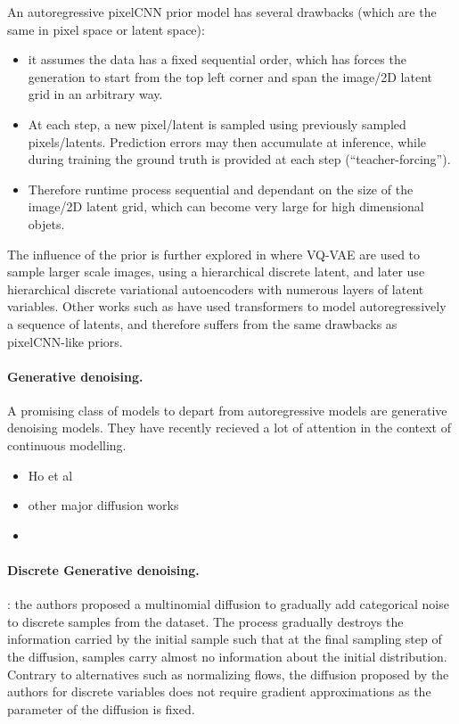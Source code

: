 \documentclass{article}
\begin{document}
An autoregressive pixelCNN prior model has several drawbacks (which are the same in pixel space or latent space):
\begin{itemize}
	\item it assumes the data has a fixed sequential order, which has forces the generation to start from the top left corner and span the image/2D latent grid in an arbitrary way.
	\item At each step, a new pixel/latent is sampled using previously sampled pixels/latents. Prediction errors may then accumulate at inference, while during training the ground truth is provided at each step (“teacher-forcing”).
	\item Therefore runtime process sequential and dependant on the size of the image/2D latent grid, which can become very large for high dimensional objets.
\end{itemize}

The influence of the prior is further explored in \cite{razavi2019generating} where VQ-VAE are used to sample larger scale images, using a hierarchical discrete latent, and later \cite{willetts:2021} use hierarchical discrete variational autoencoders with numerous layers of latent variables. Other works such as \cite{esser2021taming} have used transformers to model autoregressively a sequence of latents, and therefore suffers from the same drawbacks as pixelCNN-like priors.

\paragraph{Generative denoising.}
A promising class of models to depart from autoregressive models are generative denoising models. They have recently recieved a lot of attention in the context of continuous modelling.

\begin{itemize}
	\item Ho et al
	\item other major diffusion works
	\item \cite{de2021simulating}
\end{itemize}

\paragraph{Discrete Generative denoising.}
\cite{hoogeboom2021argmax}:  the authors proposed a multinomial diffusion to gradually add
categorical noise to discrete samples from the dataset. The process gradually destroys the information carried by the initial sample such that at the final sampling step of the diffusion, samples  carry almost no information about the initial distribution.
Contrary to alternatives such as normalizing flows, the diffusion proposed by the authors for
discrete variables does not require gradient approximations as the parameter of the diffusion is fixed.
\end{document}
